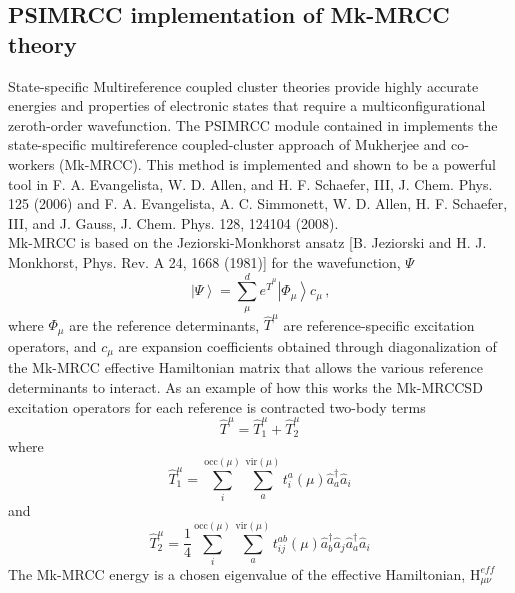 \subsection{PSIMRCC implementation of Mk-MRCC theory} \label{sec:psimrcc}
\renewcommand{\optionname}[2]{\texttt{\nameref{op-#2-#1}}}

State-specific Multireference coupled cluster theories provide highly accurate energies and properties of electronic states that require a multiconfigurational zeroth-order wavefunction.  The PSIMRCC module contained in \PSIfour implements the state-specific multireference coupled-cluster approach of Mukherjee and co-workers (Mk-MRCC). This method is implemented and shown to be a powerful tool in F. A. Evangelista, W. D. Allen, and H. F. Schaefer, III, J. Chem. Phys. 125 (2006) and F. A. Evangelista, A. C. Simmonett, W. D. Allen, H. F. Schaefer, III, and J. Gauss, J. Chem. Phys. 128, 124104 (2008).    
\\
Mk-MRCC is based on the Jeziorski-Monkhorst ansatz [B. Jeziorski and H. J. Monkhorst, Phys. Rev. A 24, 1668 (1981)] for the wavefunction, $\Psi$
\begin{equation*}
\left| \Psi \right \rangle = \sum_\mu^d e^{\hat{T}^\mu} \left| \Phi_\mu \right\rangle c_\mu \, \text{,}
\end{equation*}
where $\Phi_\mu$ are the reference determinants, $\hat{T}^\mu$ are reference-specific excitation operators, and $c_\mu$ are expansion coefficients obtained through diagonalization of the Mk-MRCC effective Hamiltonian matrix that allows the various reference determinants to interact. As an example of how this works the Mk-MRCCSD excitation operators for each reference is contracted two-body terms
\begin{equation*}
\hat{T}^\mu = \hat{T}^\mu_1 + \hat{T}^\mu_2
\end{equation*} 
where
\begin{equation*}
\hat{T}^\mu_1 = \sum_i^{\textrm{occ}(\mu)} \sum_a^{\textrm{vir}(\mu)} t_i^a (\mu) \hat{a}^\dagger_a \hat{a}_i
\end{equation*}
and
\begin{equation*}
\hat{T}^\mu_2 =\frac{1}{4} \sum_i^{\textrm{occ}(\mu)} \sum_a^{\textrm{vir}(\mu)} t_{ij}^{ab} (\mu) \hat{a}^\dagger_b \hat{a}_j \hat{a}^\dagger_a \hat{a}_i  
\end{equation*}
The Mk-MRCC energy is a chosen eigenvalue of the effective Hamiltonian, $\textrm{H}^{eff}_{\mu \nu}$
